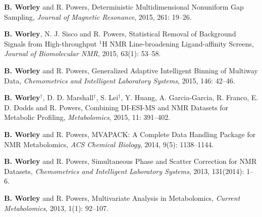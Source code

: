 \documentclass[letterpaper]{article}
\renewenvironment{itemize}{
  \begin{list}{}{
    \setlength{\leftmargin}{1.5em}
  }
}{
  \end{list}
}
\begin{document}
\begin{itemize}
\item \textbf{B. Worley} and R. Powers,
 Deterministic Multidimensional Nonuniform Gap Sampling,
 {\it Journal of Magnetic Resonance},
 2015, 261: 19--26.
\end{itemize}

\begin{itemize}
\item \textbf{B. Worley}, N. J. Sisco and R. Powers,
 Statistical Removal of Background Signals from High-throughput $^1$H NMR
 Line-broadening Ligand-affinity Screens,
 {\it Journal of Biomolecular NMR},
 2015, 63(1): 53--58.
\end{itemize}

\begin{itemize}
\item \textbf{B. Worley} and R. Powers,
 Generalized Adaptive Intelligent Binning of Multiway Data,
 {\it Chemometrics and Intelligent Laboratory Systems},
 2015, 146: 42--46.
\end{itemize}

\begin{itemize}
\item \textbf{B. Worley}$^\dagger$, D. D. Marshall$^\dagger$,
 S. Lei$^\dagger$, Y. Huang, A. Garcia-Garcia, R. Franco,
 E. D. Dodds and R. Powers, Combining DI-ESI-MS and NMR Datasets for
 Metabolic Profiling,
 {\it Metabolomics},
 2015, 11: 391--402.
\end{itemize}

\begin{itemize}
\item \textbf{B. Worley} and R. Powers,
 MVAPACK: A Complete Data Handling Package for NMR Metabolomics,
 {\it ACS Chemical Biology},
 2014, 9(5): 1138--1144.
\end{itemize}

\begin{itemize}
\item \textbf{B. Worley} and R. Powers,
 Simultaneous Phase and Scatter Correction for NMR Datasets,
 {\it Chemometrics and Intelligent Laboratory Systems},
 2013, 131(2014): 1--6.
\end{itemize}

\begin{itemize}
\item \textbf{B. Worley} and R. Powers,
 Multivariate Analysis in Metabolomics,
 {\it Current Metabolomics},
 2013, 1(1): 92--107.
\end{itemize}
\end{document}
